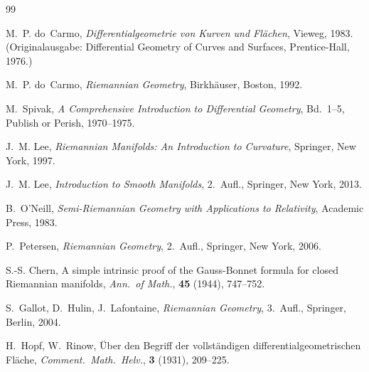 \documentclass[12pt,a4paper]{amsart}
\theoremstyle{definition}
\begin{document}
\begin{thebibliography}{99}

M.~P. do~Carmo,
\textit{Differentialgeometrie von Kurven und Flächen},
Vieweg, 1983. (Originalausgabe: Differential Geometry of Curves and Surfaces,
Prentice-Hall, 1976.)

M.~P. do~Carmo,
\textit{Riemannian Geometry},
Birkh\"auser, Boston, 1992.

M.~Spivak,
\textit{A Comprehensive Introduction to Differential Geometry},
Bd.~1--5, Publish or Perish, 1970--1975.

J.~M. Lee,
\textit{Riemannian Manifolds: An Introduction to Curvature},
Springer, New York, 1997.

J.~M. Lee,
\textit{Introduction to Smooth Manifolds},
2.~Aufl., Springer, New York, 2013.

B.~O'Neill,
\textit{Semi-Riemannian Geometry with Applications to Relativity},
Academic Press, 1983.

P.~Petersen,
\textit{Riemannian Geometry},
2.~Aufl., Springer, New York, 2006.

S.-S. Chern,
A simple intrinsic proof of the Gauss-Bonnet formula for closed Riemannian manifolds,
\textit{Ann.\ of Math.}, \textbf{45} (1944), 747--752.

S.~Gallot, D.~Hulin, J.~Lafontaine,
\textit{Riemannian Geometry},
3.~Aufl., Springer, Berlin, 2004.

H.~Hopf, W.~Rinow,
Über den Begriff der vollständigen differentialgeometrischen Fläche,
\textit{Comment.\ Math.\ Helv.}, \textbf{3} (1931), 209--225.

\end{thebibliography}
\end{document}
